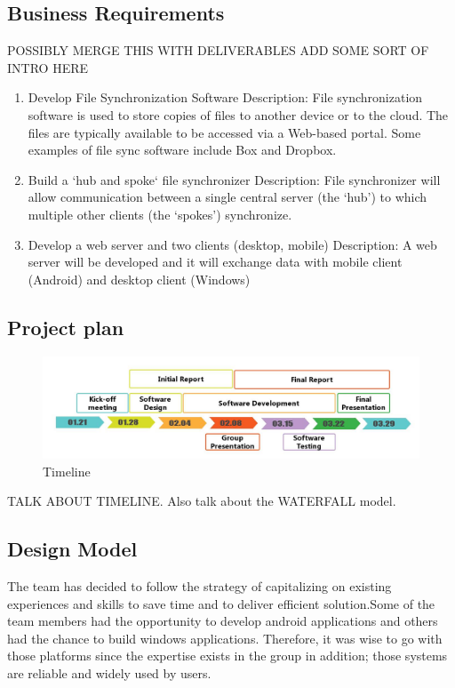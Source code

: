 \documentclass{article}
\begin{document}
\subsection{Business Requirements}
POSSIBLY MERGE THIS WITH DELIVERABLES
ADD SOME SORT OF INTRO HERE
\begin{enumerate}
  \item Develop File Synchronization Software
  Description:  File synchronization software is used to store copies of files to another device or to the cloud. The files are typically available to be accessed via a Web-based portal. Some examples of file sync software include Box and Dropbox.
  \item Build a ‘hub and spoke‘ file synchronizer
  Description: File synchronizer will allow communication between a single central server (the ‘hub’) to which multiple other clients (the ‘spokes’) synchronize.
  \item Develop a web server and two clients (desktop, mobile)
  Description: A web server will be developed and it will exchange data with mobile client (Android) and desktop client (Windows)
\end{enumerate}


\subsection{Project plan}

\begin{figure}[h]
    \centering
    \includegraphics[width=1\textwidth]{timeline}
    \caption{Timeline}
    \label{fig:timeline1}
\end{figure}

TALK ABOUT TIMELINE. Also talk about the WATERFALL model.

\subsection{Design Model}
The team has decided to follow the strategy of capitalizing on existing experiences and skills to save time and to deliver efficient solution.Some of the team members had the opportunity to develop android applications and others had the chance to build windows applications. Therefore, it was wise to go with those platforms since the expertise exists in the group in addition; those systems are reliable and widely used by users.
\end{document}
